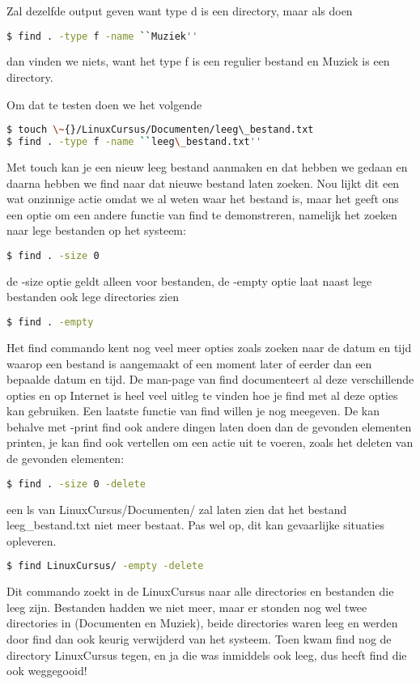 Zal dezelfde output geven want type d is een directory, maar als doen
\begin{lstlisting}[language=bash]
$ find . -type f -name ``Muziek''
\end{lstlisting}

dan vinden we niets, want het type f is een regulier bestand en Muziek is een directory.

Om dat te testen doen we het volgende
\begin{lstlisting}[language=bash]
$ touch \~{}/LinuxCursus/Documenten/leeg\_bestand.txt
$ find . -type f -name ``leeg\_bestand.txt''
\end{lstlisting}

Met touch kan je een nieuw leeg bestand aanmaken en dat hebben we gedaan en daarna hebben we find naar dat nieuwe
bestand laten zoeken. Nou lijkt dit een wat onzinnige actie omdat we al weten waar het bestand is, maar het geeft ons
een optie om een andere functie van find te demonstreren, namelijk het zoeken naar lege bestanden op het systeem:
\begin{lstlisting}[language=bash]
$ find . -size 0
\end{lstlisting}
de -size optie geldt alleen voor bestanden, de -empty optie laat naast lege bestanden ook lege directories zien
\begin{lstlisting}[language=bash]
$ find . -empty
\end{lstlisting}

Het find commando kent nog veel meer opties zoals zoeken naar de datum en tijd waarop een bestand is aangemaakt of een
moment later of eerder dan een bepaalde datum en tijd. De man-page van find documenteert al deze verschillende opties
en op Internet is heel veel uitleg te vinden hoe je find met al deze opties kan gebruiken. Een laatste functie van find
willen je nog meegeven. De kan behalve met -print find ook andere dingen laten doen dan de gevonden elementen printen,
je kan find ook vertellen om een actie uit te voeren, zoals het deleten van de gevonden elementen:

\begin{lstlisting}[language=bash]
$ find . -size 0 -delete
\end{lstlisting}
een ls van LinuxCursus/Documenten/ zal laten zien dat het bestand leeg\_bestand.txt niet meer bestaat. Pas wel op, dit
kan gevaarlijke situaties opleveren.

\begin{lstlisting}[language=bash]
$ find LinuxCursus/ -empty -delete
\end{lstlisting}

Dit commando zoekt in de LinuxCursus naar alle directories en bestanden die leeg zijn. Bestanden
hadden we niet meer, maar er stonden nog wel twee directories in (Documenten en Muziek), beide directories waren leeg
en werden door find dan ook keurig verwijderd van het systeem. Toen kwam find nog de directory LinuxCursus tegen, en ja
die was inmiddels ook leeg, dus heeft find die ook weggegooid!
